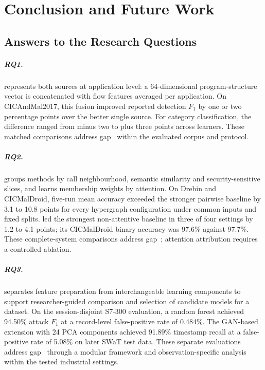 \chapter{Conclusion and Future Work}
\label{chap:conclusion}

\section{Answers to the Research Questions}
\label{sec:conclusion:1}

\paragraph{RQ1.} \emph{\rqOneText} \hybroid{} represents both sources at application level:
a 64-dimensional program-structure vector is concatenated with \netfeatures{} flow features
averaged per application. On CICAndMal2017, this fusion improved reported detection $F_1$ by one
or two percentage points over the better single source. For category
classification, the difference ranged from minus two to plus three points across learners.
These matched comparisons address gap~ within the evaluated corpus and protocol.

\paragraph{RQ2.} \emph{\rqTwoText} \hgann{} groups methods by call neighbourhood, semantic
similarity and security-sensitive slices, and learns membership weights by attention.
On Drebin and CICMalDroid, five-run mean accuracy exceeded the stronger pairwise baseline by
3.1 to 10.8 points for every hypergraph configuration under common inputs and fixed splits.
\hgann{} led the strongest non-attentive baseline in three of four settings by 1.2 to 4.1
points; its CICMalDroid binary accuracy was 97.6\% against 97.7\%. These complete-system
comparisons address gap~; attention attribution requires a controlled ablation.

\paragraph{RQ3.} \emph{\rqThreeText} \nadics{} separates feature preparation from
interchangeable learning components to support researcher-guided comparison and selection of
candidate models for a dataset. On the session-disjoint S7-300 evaluation, a random forest
achieved 94.50\% attack $F_1$ at a record-level false-positive rate of 0.484\%.
The GAN-based extension with 24 PCA components achieved 91.89\% timestamp recall at a
false-positive rate of 5.08\% on later SWaT test data. These separate evaluations address
gap~ through a modular framework and observation-specific analysis within the tested
industrial settings.

